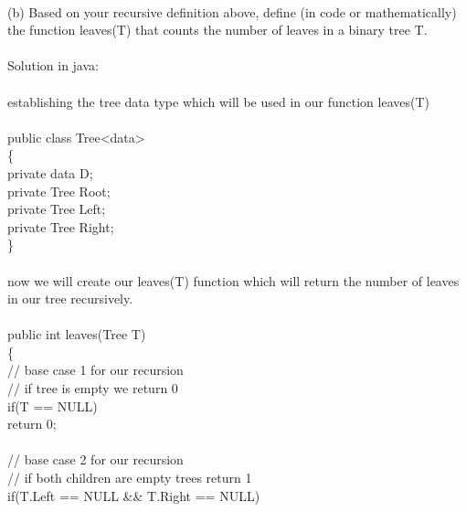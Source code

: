 \documentclass{article}
\newcommand*\moveToRight[1]{\hspace*{0em plus 1fill}\makebox{(#1)}}
\newcommand*\fixindent{ \hspace{1pt}\\}
\begin{document}
\fixindent{}
(b) Based on your recursive definition above, define (in code or mathematically) the function leaves(T)
that counts the number of leaves in a binary tree T. \moveToRight{4 marks}\\\\Solution in java:\\
\\establishing the tree data type which will be used in our function leaves(T) \\\\
\hspace*{50pt}public class Tree\textless  data\textgreater\\
\hspace*{50pt}\{\\
\hspace*{65pt} private data D;\\
\hspace*{65pt} private Tree Root;\\
\hspace*{65pt} private Tree Left;\\
\hspace*{65pt} private Tree Right;\\
\hspace*{50pt}\}\\\\
now we will create our leaves(T) function which will return
the number of leaves in our tree recursively.\\\\
\hspace*{50pt}public int leaves(Tree T)\\
\hspace*{50pt}\{\\
\hspace*{65pt}// base case 1 for our recursion \\
\hspace*{65pt}// if tree is empty we return 0 \\
\hspace*{65pt} if(T == NULL)\\
\hspace*{80pt} return 0;\\\\
\hspace*{65pt}// base case 2 for our recursion \\
\hspace*{65pt}// if both children are empty trees return 1 \\
\hspace*{65pt} if(T.Left == NULL \&\& T.Right == NULL)\\
\end{document}
